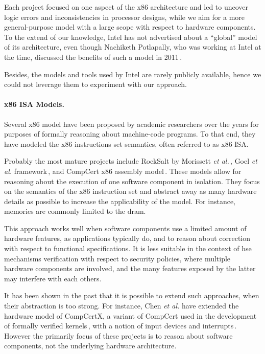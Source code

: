 Each project focused on one aspect of the x86 architecture and led to uncover
logic errors and inconsistencies in processor designs, while we aim for a more
general-purpose model with a large scope with respect to hardware components. 
%
To the extend of our knowledge, Intel has not advertised about a ``global''
model of its architecture, even though Nachiketh Potlapally, who was working at
Intel at the time, discussed the benefits of such a model in
2011\,\cite{potlapally2011hardwaresecurity}.

Besides, the models and tools used by Intel are rarely publicly available, hence
we could not leverage them to experiment with our approach.
%

\paragraph{x86 ISA Models.}
%
Several x86 model have been proposed by academic researchers over the years for
purposes of formally reasoning about machine-code programs.
%
To that end, they have modeled the x86 instructions set semantics, often
referred to as x86 ISA.

Probably the most mature projects include RockSalt by Morissett \emph{et
  al.}\,\cite{morrisett2012rocksalt}, Goel \emph{et al.}
framework\,\cite{goel2014x86}, and CompCert x86 assembly
model\,\cite{leroy2012compcert}.
%
These models allow for reasoning about the execution of one software component
in isolation. They focus on the semantics of the x86 instruction set and
abstract away as many hardware details as possible to increase the applicability
of the model.
%
For instance, memories are commonly limited to the \ac{dram}.

This approach works well when software components use a limited amount of
hardware features, as applications typically do, and to reason about correction
with respect to functional specifications.
%
It is less suitable in the context of \ac{hse} mechanisms verification with
respect to security policies, where multiple hardware components are involved,
and the many features exposed by the latter may interfere with each others.

It has been shown in the past that it is possible to extend such approaches, when their
abstraction is too strong.
%
For instance, Chen \emph{et al.} have extended the hardware model of CompCertX,
a variant of CompCert used in the development of formally verified
kernels\,\cite{gu2016certikos}, with a notion of input devices and
interrupts\,\cite{chen2018interrupt}.
%
However the primarily focus of these projects is to reason about software
components, not the underlying hardware architecture.

